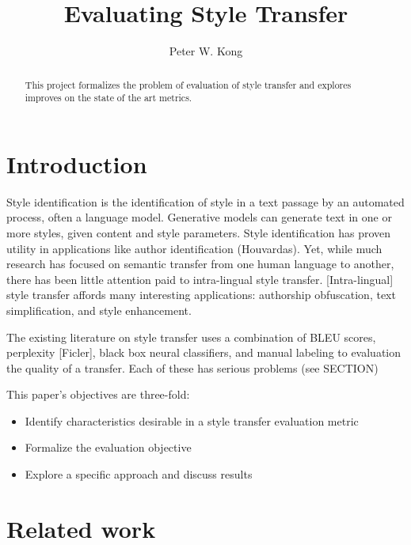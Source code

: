 \documentclass[letterpaper, 10 pt, conference]{ieeeconf}  %
\title{\LARGE \bf
Evaluating Style Transfer
}
\author{Peter W. Kong}
\begin{document}
\maketitle
\thispagestyle{empty}
\pagestyle{empty}


\begin{abstract}

This project formalizes the problem of evaluation of style transfer and explores improves on the state of the art metrics.

\end{abstract}




\section{Introduction}
                
        
Style identification is the identification of style in a text passage by an automated process, often a language model. Generative models can generate text in one or more styles, given content and style parameters. Style identification has proven utility in applications like author identification (Houvardas). Yet, while much research has focused on semantic transfer from one human language to another, there has been little attention paid to intra-lingual style transfer. [Intra-lingual] style transfer affords many interesting applications: authorship obfuscation, text simplification, and style enhancement.

The existing literature on style transfer uses a combination of BLEU scores, perplexity [Ficler], black box neural classifiers, and manual labeling to evaluation the quality of a transfer. Each of these has serious problems (see SECTION)


This paper’s objectives are three-fold:
\begin{itemize}
    \item Identify characteristics desirable in a style transfer evaluation metric
    \item Formalize the evaluation objective
    \item Explore a specific approach and discuss results
\end{itemize}
          

          
\section{Related work}
\end{document}
